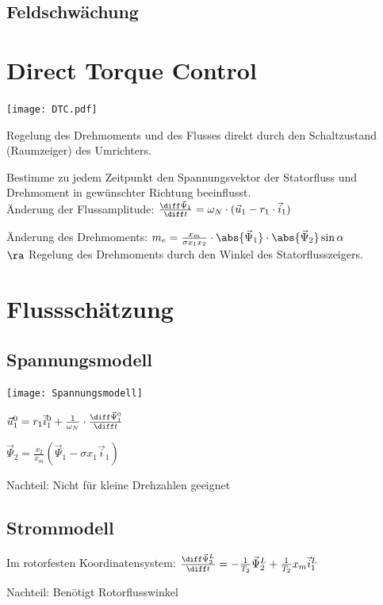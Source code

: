 \documentclass[german]{latex4ei_fs}
\begin{document}
\begin{sectionbox}
\subsection{Feldschwächung}    
\end{sectionbox}
\section{Direct Torque Control} 
\begin{sectionbox}
\texttt{[image: DTC.pdf]}


Regelung des Drehmoments und des Flusses direkt durch den Schaltzustand (Raumzeiger) des Umrichters.

Bestimme zu jedem Zeitpunkt den Spannungsvektor der Statorfluss und Drehmoment in gewünschter Richtung beeinflusst. \\


Änderung der Flussamplitude: $\frac{\diff \vec \Psi_1}{\diff t} = \omega_N \cdot (\vec u_1 - r_1 \cdot \vec i_1)$

Änderung des Drehmoments: $m_e = \frac{x_m}{\sigma x_1 x_2} \cdot \abs{\vec \Psi_1} \cdot \abs{\vec \Psi_2} \sin \alpha$ \\
$\ra $ Regelung des Drehmoments durch den Winkel des Statorflusszeigers.
\end{sectionbox}

\section{Flussschätzung} 

\begin{sectionbox}
\subsection{Spannungsmodell}

\texttt{[image: Spannungsmodell]} 

$\vec u_1^0 = r_1 \vec i_1^0 + \frac{1}{\omega_N} \cdot \frac{\diff \vec \Psi_1^0}{\diff t}$

$\vec \Psi_2 = \frac{x_2}{x_m} (\vec \Psi_1 - \sigma x_1 \vec i_1 )$

Nachteil: Nicht für kleine Drehzahlen geeignet
\end{sectionbox}

\begin{sectionbox}
\subsection{Strommodell}

Im rotorfesten Koordinatensystem: 
$\frac{\diff \vec \Psi_2^L}{\diff t} = - \frac{1}{T_2} \vec \Psi_2^L + \frac{1}{T_2} x_m \vec i_1^L$

Nachteil: Benötigt Rotorflusswinkel
\end{sectionbox}
\end{document}
